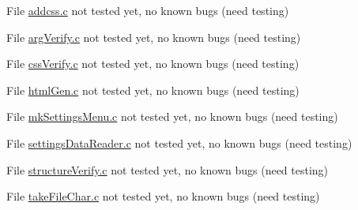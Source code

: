 
\begin{DoxyRefList}
\item[File \mbox{\hyperlink{addcss_8c}{addcss.c}} ]\label{bug__bug000001}%
%
not tested yet, no known bugs (need testing)  
\item[File \mbox{\hyperlink{argVerify_8c}{arg\+Verify.c}} ]\label{bug__bug000002}%
%
not tested yet, no known bugs (need testing)  
\item[File \mbox{\hyperlink{cssVerify_8c}{css\+Verify.c}} ]\label{bug__bug000003}%
%
not tested yet, no known bugs (need testing)  
\item[File \mbox{\hyperlink{htmlGen_8c}{html\+Gen.c}} ]\label{bug__bug000004}%
%
not tested yet, no known bugs (need testing) 
\item[File \mbox{\hyperlink{mkSettingsMenu_8c}{mk\+Settings\+Menu.c}} ]\label{bug__bug000005}%
%
not tested yet, no known bugs (need testing)  
\item[File \mbox{\hyperlink{settingsDataReader_8c}{settings\+Data\+Reader.c}} ]\label{bug__bug000006}%
%
not tested yet, no known bugs (need testing)  
\item[File \mbox{\hyperlink{structureVerify_8c}{structure\+Verify.c}} ]\label{bug__bug000007}%
%
not tested yet, no known bugs (need testing)  
\item[File \mbox{\hyperlink{takeFileChar_8c}{take\+File\+Char.c}} ]\label{bug__bug000008}%
%
not tested yet, no known bugs (need testing) 
\end{DoxyRefList}